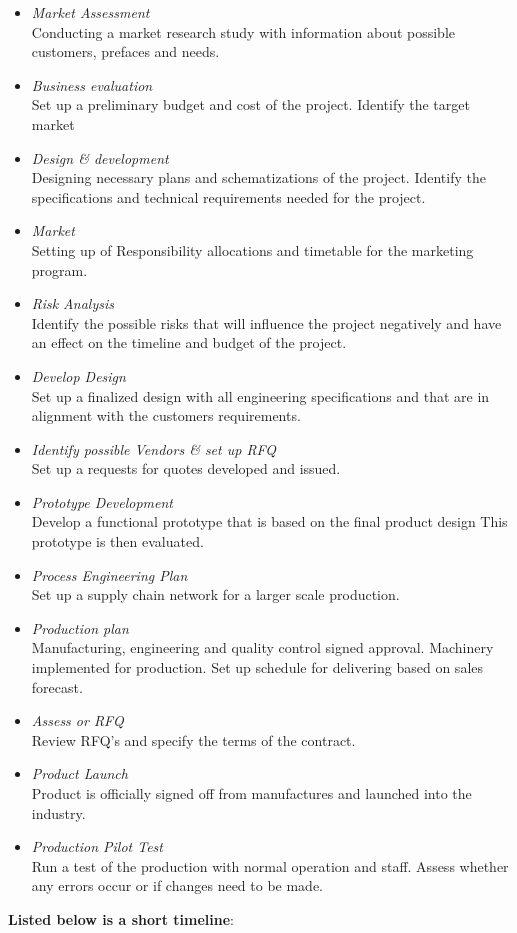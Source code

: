 \begin{itemize}
\item \emph{Market Assessment}\\
Conducting a market research study with information about possible customers, prefaces and needs.
\item \emph{Business evaluation}\\
Set up a preliminary budget and cost of the project. Identify the target market
\item \emph{Design \& development}\\
Designing necessary plans and schematizations of the project. Identify the specifications and technical requirements needed for the project.
\item \emph{Market}\\
Setting up of Responsibility allocations and timetable for the marketing program.
\item \emph{Risk Analysis}\\
Identify the possible risks that will influence the project negatively and have an effect on the timeline and budget of the project.
\item \emph{Develop Design}\\
Set up a finalized design with all engineering specifications and that are in alignment with the customers requirements.
\item \emph{Identify possible Vendors \& set up RFQ}\\
Set up a requests for quotes developed and issued.
\item \emph{Prototype Development}\\
Develop a functional prototype that is based on the final product design This prototype is then evaluated.
\item \emph{Process Engineering Plan}\\
Set up a supply chain network for a larger scale production.
\item \emph{Production plan}\\
Manufacturing, engineering and quality control signed approval. Machinery implemented for production. Set up schedule for delivering based on sales forecast.
\item \emph{Assess or RFQ}\\
Review RFQ’s and specify the terms of the contract.
\item \emph{Product Launch}\\
Product is officially signed off from manufactures and launched into the industry.
\item \emph{Production Pilot Test}\\
Run a test of the production with normal operation and staff. Assess whether any errors occur or if changes need to be made.
\end{itemize}
\vspace{1cm}
\noindent
\textbf{Listed below is a short timeline}:\\

